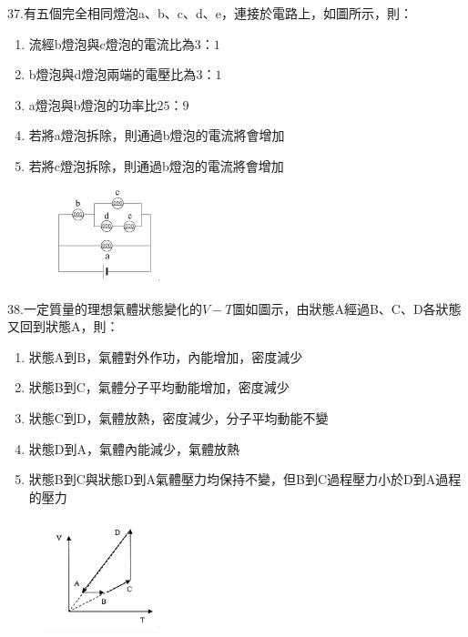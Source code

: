 \documentclass[cn,10pt,math=newtx]{elegantbook}
\begin{document}
\begin{example}
   37.有五個完全相同燈泡a、b、c、d、e，連接於電路上，如圖所示，則：
   \begin{enumerate}[label=(\Alph*)]
    \item 流經b燈泡與c燈泡的電流比為$3：1$
    \item b燈泡與d燈泡兩端的電壓比為$3：1$
    \item a燈泡與b燈泡的功率比$25：9$
    \item 若將a燈泡拆除，則通過b燈泡的電流將會增加
    \item 若將c燈泡拆除，則通過b燈泡的電流將會增加
   \end{enumerate}

    \rightline{[成德高中教甄109]}
\end{example}
\begin{solution}
    
\end{solution}
\begin{figure}[htbp]
    \flushright
    \includegraphics[width=0.3\textwidth]{image/109成德37.png}
  \end{figure}
\newpage


\begin{example}
   38.一定質量的理想氣體狀態變化的$V-T$圖如圖示，由狀態A經過B、C、D各狀態又回到狀態A，則：
   \begin{enumerate}[label=(\Alph*)]
     \item 狀態A到B，氣體對外作功，內能增加，密度減少
     \item 狀態B到C，氣體分子平均動能增加，密度減少
     \item 狀態C到D，氣體放熱，密度減少，分子平均動能不變
     \item 狀態D到A，氣體內能減少，氣體放熱
     \item 狀態B到C與狀態D到A氣體壓力均保持不變，但B到C過程壓力小於D到A過程的壓力
   \end{enumerate}

    \rightline{[成德高中教甄109]}
\end{example}
\begin{solution}
    
\end{solution}
\begin{figure}[htbp]
    \flushright
    \includegraphics[width=0.3\textwidth]{image/109成德38.png}
  \end{figure}
\newpage
\end{document}
